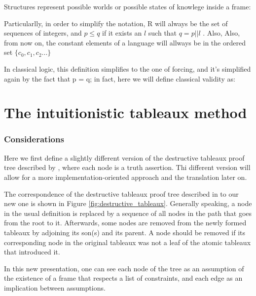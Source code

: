 \documentclass[runningheads]{llncs}
\begin{document}
\structureDefinition
Structures represent possible worlds or possible states of knowlege inside a frame:
\kripkeFrameDefinition

Particularlly, in order to simplify the notation, R will always be the set of sequences of integers, and $p \leq q$ if it exists an $l$ such that $q =  p||l$  . Also,    
 Also, from now on, the constant elements of a language will allways be in the ordered set $\{c_0, c_1, c_2 ...\}$
 
 \figureRandFrame

\forcingDefinition

\intuitionisticValidityDefinition

In classical logic, this definition simplifies to the one of forcing, and it's simplified again by the fact that p = q; in fact, here we will define classical validity as: \cite{book1}

\classicalValidityDefinition

\section{The intuitionistic tableaux method}

\subsubsection{Considerations}
    Here we first define a slightly different version of the destructive tableaux proof tree described by \cite{book1}, where each node is a truth assertion. Thi different version  will allow for a more implementation-oriented approach and the translation later on.

    The correspondence of the destructive tableaux proof tree described in \cite{book1} to our new one is shown in Figure \ref{fig:destructive_tableaux}. Generally speaking, a node in the usual definition is replaced by a sequence of all nodes in the path that goes from the root to it. Afterwards, some nodes are removed from the newly formed tableaux by adjoining its son(s) and its parent. A node should be removed if its corresponding node in the original tableaux was not a leaf of the atomic tableaux \cite{book1} that introduced it.


    \tableauxCumulativeAndNonCumulativeExampleFigure
    In this new presentation, one can see each node of the tree as an assumption of the existence of 
    a frame that respects a list of constraints, and each edge as an implication between assumptions.
\end{document}
